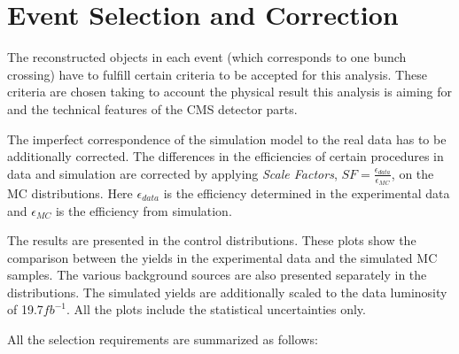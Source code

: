 \section{Event Selection and Correction}\label{sec:sel}

The reconstructed objects in each event (which corresponds to one bunch crossing) have to fulfill certain criteria to be accepted for this analysis. These 
criteria are chosen taking to account the physical result this analysis is aiming for and the technical features of the CMS detector parts.

The imperfect correspondence of the simulation model to the real data has to be additionally corrected. The differences in the efficiencies 
of certain procedures in data and simulation are corrected by applying \textit{Scale Factors}, $SF = \frac{\epsilon_{data}}{\epsilon_{MC}}$, 
on the MC distributions. Here $\epsilon_{data}$ is the efficiency determined in the experimental data and $\epsilon_{MC}$ is the efficiency from
simulation. 

The results are presented in the control distributions. These plots show the comparison between the yields in the experimental data and the simulated MC samples.
The various background sources are also presented separately in the distributions. The simulated yields are additionally scaled to the data luminosity of 19.7\;$fb^{-1}$.
All the plots include the statistical uncertainties only.

All the selection requirements are summarized as follows:

